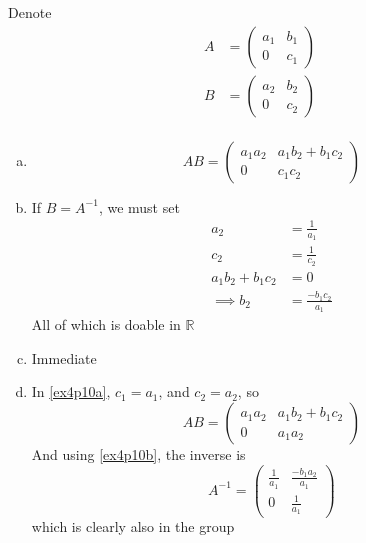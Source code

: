 \documentclass{article}
\newcommand{\reals}{\mathbb{R}}
\newcommand{\inv}[1]{ {#1}^{-1} }
\begin{document}
\subsubsection{}\label{ex4p10}
Denote 
\begin{align*}
A &= 
\begin{pmatrix}
a_1 & b_1\\
0 & c_1
\end{pmatrix}\\
B &= 
\begin{pmatrix}
a_2 & b_2\\
0 & c_2
\end{pmatrix}\\
\end{align*}
\begin{enumerate}[(a)]
\item \label{ex4p10a}
\begin{equation*}
AB = 
\begin{pmatrix}
a_1a_2 & a_1b_2 + b_1c_2\\
0 & c_1c_2
\end{pmatrix}
\end{equation*}
\item \label{ex4p10b}
If $B = \inv{A}$, we must set 
\begin{align*}
a_2 &= \frac{1}{a_1}\\
c_2 &= \frac{1}{c_2}\\
a_1b_2 + b_1c_2 &= 0\\
\implies b_2 &= \frac{-b_1c_2}{a_1}
\end{align*}
All of which is doable in $\reals$
\item Immediate
\item \label{ex4p10d}
In \ref{ex4p10a}, $c_1 = a_1$, and $c_2 = a_2$, so
\begin{equation*}
AB = 
\begin{pmatrix}
a_1a_2	&	a_1b_2 + b_1c_2\\
0		&	a_1a_2
\end{pmatrix}
\end{equation*}
And using \ref{ex4p10b}, the inverse is
\begin{equation*}
\inv{A} =
\begin{pmatrix}
\frac{1}{a_1}	&	\frac{-b_1a_2}{a_1}\\
0				&	\frac{1}{a_1}
\end{pmatrix}
\end{equation*}
which is clearly also in the group
\end{enumerate}
\end{document}

